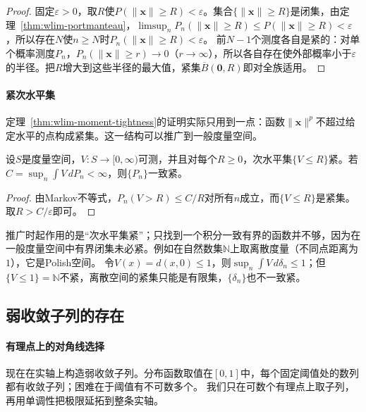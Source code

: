 \begin{proof}
固定$\varepsilon>0$，取$R$使$P(\lVert\bm x\rVert\geq R)<\varepsilon$。集合$\{\lVert\bm x\rVert\geq R\}$是闭集，由定理~\ref{thm:wlim-portmanteau}，$\limsup_nP_n(\lVert\bm x\rVert\geq R)\leq P(\lVert\bm x\rVert\geq R)<\varepsilon$，所以存在$N$使$n\geq N$时$P_n(\lVert\bm x\rVert\geq R)<\varepsilon$。
前$N-1$个测度各自是紧的：对单个概率测度$P_n$，$P_n(\lVert\bm x\rVert\geq r)\to0$（$r\to\infty$），所以各自存在使外部概率小于$\varepsilon$的半径。把$R$增大到这些半径的最大值，紧集$\overline B(\bm 0,R)$即对全族适用。
\end{proof}

\paragraph{紧次水平集}
定理~\ref{thm:wlim-moment-tightness}的证明实际只用到一点：函数$\lVert\bm x\rVert^p$不超过给定水平的点构成紧集。这一结构可以推广到一般度量空间。

\begin{theorem}[紧次水平集的控制函数]
\label{thm:wlim-sublevel-tightness}
设$S$是度量空间，$V:S\to[0,\infty)$可测，并且对每个$R\geq0$，次水平集$\{V\leq R\}$紧。若$C=\sup_n\int V\,dP_n<\infty$，则$\{P_n\}$一致紧。
\end{theorem}

\begin{proof}
由Markov不等式，$P_n(V>R)\leq C/R$对所有$n$成立，而$\{V\leq R\}$是紧集。取$R>C/\varepsilon$即可。
\end{proof}

推广时起作用的是“次水平集紧”；只找到一个积分一致有界的函数并不够，因为在一般度量空间中有界闭集未必紧。例如在自然数集$\mathbb N$上取离散度量（不同点距离为$1$），它是Polish空间。
令$V(x)=d(x,0)\leq1$，则$\sup_n\int V\,d\delta_n\leq1$；但$\{V\leq1\}=\mathbb N$不紧，离散空间的紧集只能是有限集，$\{\delta_n\}$也不一致紧。

\subsection{弱收敛子列的存在}

\paragraph{有理点上的对角线选择}
现在在实轴上构造弱收敛子列。分布函数取值在$[0,1]$中，每个固定阈值处的数列都有收敛子列；困难在于阈值有不可数多个。
我们只在可数个有理点上取子列，再用单调性把极限延拓到整条实轴。

